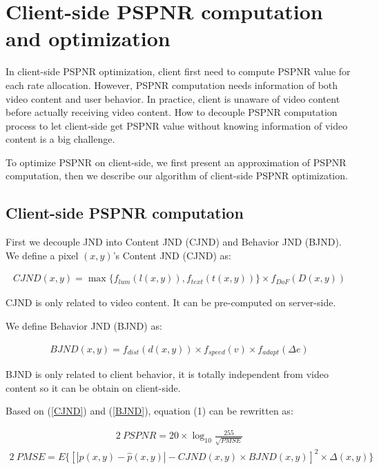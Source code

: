\section{Client-side PSPNR computation and optimization}

In client-side PSPNR optimization, client first need to compute PSPNR value for each rate allocation. However, PSPNR computation needs information of both video content and user behavior. In practice, client is unaware of video content before actually receiving video content. How to decouple PSPNR computation process to let client-side get PSPNR value without knowing information of video content is a big challenge.

To optimize PSPNR on client-side, we first present an approximation of PSPNR computation, then we describe our algorithm of client-side PSPNR optimization.

\subsection{Client-side PSPNR computation}

First we decouple JND into Content JND (CJND) and Behavior JND (BJND). We define a pixel $(x, y)$'s Content JND (CJND) as:

\begin{equation}
\begin{aligned}
CJND(x, y) = \max \{ f_{lum}(l(x, y)) , f_{text}(t(x, y))\} \times f_{DoF}(D(x, y)) \label{CJND}
\end{aligned}
\end{equation}

CJND is only related to video content. It can be pre-computed on server-side.

We define Behavior JND (BJND) as:

\begin{equation}
\begin{aligned}
BJND(x, y) =  f_{dist}(d(x, y)) \times f_{speed}(v) \times f_{adapt}(\Delta e) \label{BJND}
\end{aligned}
\end{equation}

BJND is only related to client behavior, it is totally independent from video content so it can be obtain on client-side. 

Based on (\ref{CJND}) and (\ref{BJND}), equation (1) can be rewritten as:

\begin{alignat}{2}\
\label{f1} PSPNR = 20 \times \log_{10}\frac{255}{\sqrt{PMSE}}
\end{alignat}
\begin{alignat}{2}\
PMSE=E\{ \left[ |p(x, y) - \hat{p}(x, y)| - CJND(x, y) \times BJND(x, y)\right]^2 \times \Delta (x, y)\} \label{apprxPMSE}
\end{alignat} 

